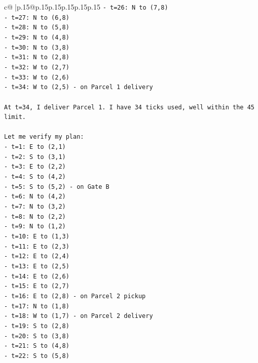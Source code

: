 \documentclass{article}
\begin{document}
{\begin{supertabular}{c@{$\;$}|p{.15\linewidth}@{}p{.15\linewidth}p{.15\linewidth}p{.15\linewidth}p{.15\linewidth}p{.15\linewidth}}
{{{\texttt{{-} t=26: N to (7,8)} \\
\texttt{{-} t=27: N to (6,8)} \\
\texttt{{-} t=28: N to (5,8)} \\
\texttt{{-} t=29: N to (4,8)} \\
\texttt{{-} t=30: N to (3,8)} \\
\texttt{{-} t=31: N to (2,8)} \\
\texttt{{-} t=32: W to (2,7)} \\
\texttt{{-} t=33: W to (2,6)} \\
\texttt{{-} t=34: W to (2,5) {-} on Parcel 1 delivery} \\
\\ 
\texttt{At t=34, I deliver Parcel 1. I have 34 ticks used, well within the 45 limit.} \\
\\ 
\texttt{Let me verify my plan:} \\
\texttt{{-} t=1: E to (2,1)} \\
\texttt{{-} t=2: S to (3,1)} \\
\texttt{{-} t=3: E to (2,2)} \\
\texttt{{-} t=4: S to (4,2)} \\
\texttt{{-} t=5: S to (5,2) {-} on Gate B} \\
\texttt{{-} t=6: N to (4,2)} \\
\texttt{{-} t=7: N to (3,2)} \\
\texttt{{-} t=8: N to (2,2)} \\
\texttt{{-} t=9: N to (1,2)} \\
\texttt{{-} t=10: E to (1,3)} \\
\texttt{{-} t=11: E to (2,3)} \\
\texttt{{-} t=12: E to (2,4)} \\
\texttt{{-} t=13: E to (2,5)} \\
\texttt{{-} t=14: E to (2,6)} \\
\texttt{{-} t=15: E to (2,7)} \\
\texttt{{-} t=16: E to (2,8) {-} on Parcel 2 pickup} \\
\texttt{{-} t=17: N to (1,8)} \\
\texttt{{-} t=18: W to (1,7) {-} on Parcel 2 delivery} \\
\texttt{{-} t=19: S to (2,8)} \\
\texttt{{-} t=20: S to (3,8)} \\
\texttt{{-} t=21: S to (4,8)} \\
\texttt{{-} t=22: S to (5,8)} \\
}}}
\end{supertabular}}
\end{document}

